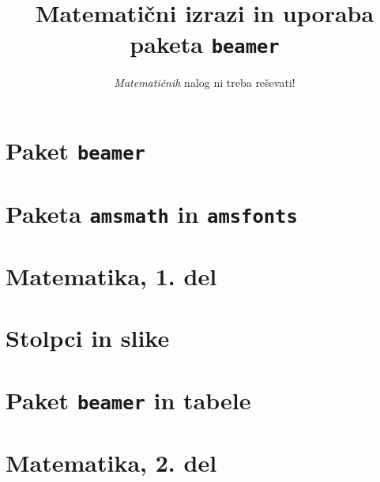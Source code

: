 \documentclass{beamer}
\begin{document}
\title{Matematični izrazi in uporaba paketa \texttt{beamer}}
\subtitle{\emph{Matematičnih} nalog ni treba reševati!}
\date{}

\begin{frame}
\titlepage
\end{frame}


 \tableofcontents

    

\section{Paket \texttt{beamer}}


\section{Paketa \texttt{amsmath} in \texttt{amsfonts}}


\section[Matematika, 1. del\\\large{Analiza, logika, množice}]{Matematika, 1. del}


\section{Stolpci in slike}


\section{Paket \texttt{beamer} in tabele}


\section[Matematika, 2. del\\\large{Zaporedja, algebra, grupe}]{Matematika, 2. del}

\end{document}
